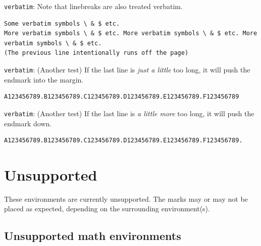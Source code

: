 \begin{test} %
  \texttt{verbatim}:
  Note that linebreaks are also treated verbatim.
\begin{verbatim}
Some verbatim symbols \ & $ etc.
More verbatim symbols \ & $ etc. More verbatim symbols \ & $ etc. More verbatim symbols \ & $ etc.
(The previous line intentionally runs off the page) \end{verbatim}
\end{test}

\begin{test} %
  \texttt{verbatim}:
  (Another test)
  If the last line is \emph{just a little} too long, it will push the endmark into the margin.
\begin{verbatim}
A123456789.B123456789.C123456789.D123456789.E123456789.F123456789 \end{verbatim}
\end{test}
\begin{test} %
  \texttt{verbatim}:
  (Another test)
  If the last line is \emph{a little more} too long, it will push the endmark down.
\begin{verbatim}
A123456789.B123456789.C123456789.D123456789.E123456789.F123456789. \end{verbatim}
\end{test}



\section{Unsupported}

These environments are currently unsupported.
The marks may or may not be placed as expected, depending on the surrounding environment(s).

\subsection{Unsupported math environments}







